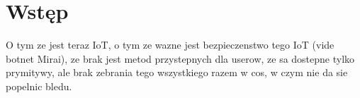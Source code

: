 \chapter{Wstęp}
\label{cha:wstep}

O tym ze jest teraz IoT, o tym ze wazne jest bezpieczenstwo tego IoT (vide botnet Mirai), ze brak jest metod przystepnych dla userow, ze sa dostepne tylko prymitywy, ale brak zebrania tego wszystkiego razem w cos, w czym nie da sie popelnic bledu.
